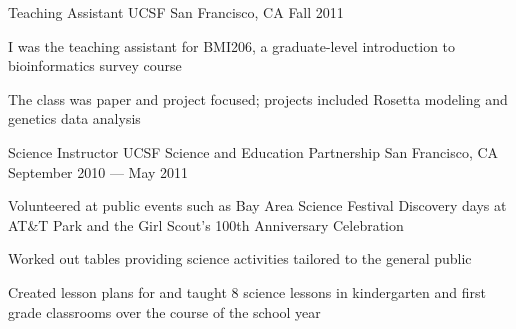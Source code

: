 \begin{cventries}
  \cventry
  {Teaching Assistant} %
  {UCSF} %
  {San Francisco, CA} %
  {Fall 2011} %
  {
    \begin{cvitems} %
    \item I was the teaching assistant for BMI206, a graduate-level introduction to bioinformatics survey course
    \item The class was paper and project focused; projects included Rosetta modeling and genetics data analysis
    \end{cvitems}
  }

  \cventry
  {Science Instructor} %
  {UCSF Science and Education Partnership} %
  {San Francisco, CA} %
  {September 2010 --- May 2011} %
  {
    \begin{cvitems} %
    \item Volunteered at public events such as Bay Area Science Festival Discovery days at AT\&T Park and the Girl Scout's 100th Anniversary Celebration
    \item Worked out tables providing science activities tailored to the general public
    \item Created lesson plans for and taught 8 science lessons in kindergarten and first grade classrooms over the course of the school year
    \end{cvitems}
  }

\end{cventries}
